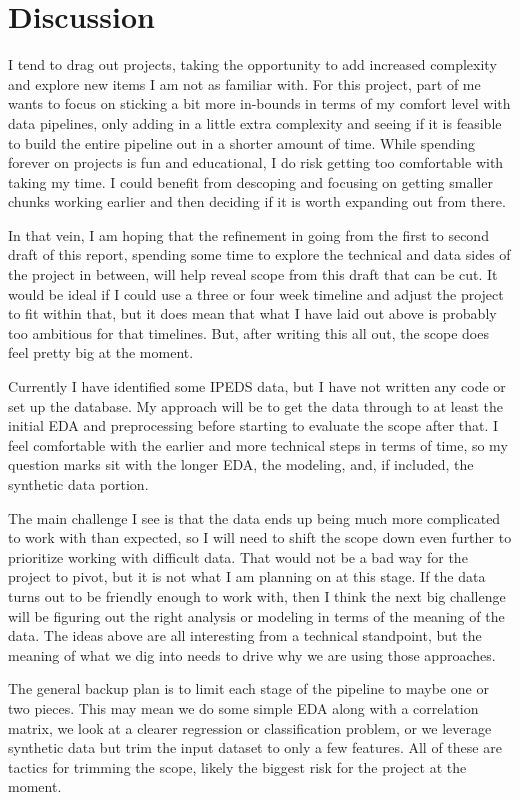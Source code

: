 \documentclass[sigconf, authorversion, nonacm]{acmart}
\begin{document}
\section{Discussion}
    I tend to drag out projects, taking the opportunity to add increased complexity and explore new items I am not as familiar with. For this project, part of me wants to focus on sticking a bit more in-bounds in terms of my comfort level with data pipelines, only adding in a little extra complexity and seeing if it is feasible to build the entire pipeline out in a shorter amount of time. While spending forever on projects is fun and educational, I do risk getting too comfortable with taking my time. I could benefit from descoping and focusing on getting smaller chunks working earlier and then deciding if it is worth expanding out from there.

    In that vein, I am hoping that the refinement in going from the first to second draft of this report, spending some time to explore the technical and data sides of the project in between, will help reveal scope from this draft that can be cut. It would be ideal if I could use a three or four week timeline and adjust the project to fit within that, but it does mean that what I have laid out above is probably too ambitious for that timelines. But, after writing this all out, the scope does feel pretty big at the moment.

    Currently I have identified some IPEDS data, but I have not written any code or set up the database. My approach will be to get the data through to at least the initial EDA and preprocessing before starting to evaluate the scope after that. I feel comfortable with the earlier and more technical steps in terms of time, so my question marks sit with the longer EDA, the modeling, and, if included, the synthetic data portion.

    The main challenge I see is that the data ends up being much more complicated to work with than expected, so I will need to shift the scope down even further to prioritize working with difficult data. That would not be a bad way for the project to pivot, but it is not what I am planning on at this stage. If the data turns out to be friendly enough to work with, then I think the next big challenge will be figuring out the right analysis or modeling in terms of the meaning of the data. The ideas above are all interesting from a technical standpoint, but the meaning of what we dig into needs to drive why we are using those approaches.

    The general backup plan is to limit each stage of the pipeline to maybe one or two pieces. This may mean we do some simple EDA along with a correlation matrix, we look at a clearer regression or classification problem, or we leverage synthetic data but trim the input dataset to only a few features. All of these are tactics for trimming the scope, likely the biggest risk for the project at the moment.
\end{document}
